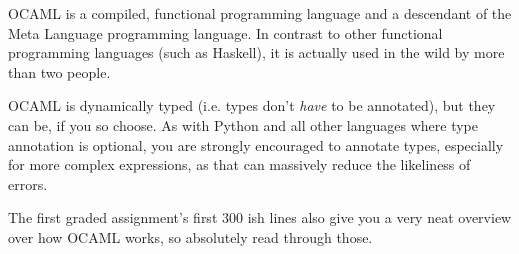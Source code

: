OCAML is a compiled, functional programming language and a descendant of the Meta Language programming language.
In contrast to other functional programming languages (such as Haskell), it is actually used in the wild by more than two people.


OCAML is dynamically typed (i.e. types don't \textit{have} to be annotated), but they can be, if you so choose.
As with Python and all other languages where type annotation is optional, you are strongly encouraged to annotate types, especially for more complex expressions,
as that can massively reduce the likeliness of errors.

The first graded assignment's first 300 ish lines also give you a very neat overview over how OCAML works,
so absolutely read through those.
